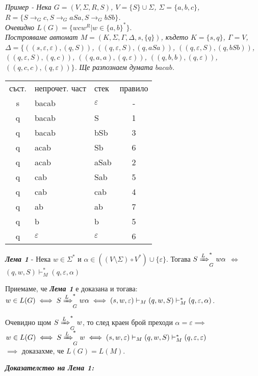 \documentclass[fleqn,12pt]{article}
\begin{document}
\begin{flushleft}
\textit{Пример - Нека $G = (V, \Sigma, R, S)$, $V = \{S\} \cup \Sigma$, $\Sigma = \{a, b, c\}$, $R = \{S \to_G c, S \to_G aSa, S \to_G bSb\}$.} \\
\textit{Очевидно $L(G) = \{wcw^R | w \in \{a, b\}^*\}$}. \\
\textit{Построяваме автомат $M = (K, \Sigma, \Gamma, \Delta, s, \{q\})$, където $K = \{s, q\}$, $\Gamma = V$, $\Delta = \{$$((s, \varepsilon, \varepsilon), (q, S))$, $((q, \varepsilon, S), (q, aSa))$, $((q, \varepsilon, S), (q, bSb))$, $((q, \varepsilon, S), (q, c))$, $((q, a, a), (q, \varepsilon))$, $((q, b, b), (q, \varepsilon))$, $((q, c, c), (q, \varepsilon))$$\}$.}
\textit{Ще разпознаем думата $bacab$.}

\begin{tabular}{ |c|l|l|c| } 
\hline
съст. & непрочет. част & стек & правило \\ 
s & bacab & $\varepsilon$ & - \\
q & bacab & S & 1 \\
q & bacab & bSb & 3 \\
q & acab & Sb & 6 \\
q & acab & aSab & 2 \\
q & cab & Sab & 5 \\
q & cab & cab & 4 \\
q & ab & ab & 7 \\
q & b & b & 5 \\
q & $\varepsilon$ & $\varepsilon$ & 6 \\
\hline
\end{tabular}

\textit{\textbf{Лема 1}} - Нека $w \in \Sigma^*$ и $\alpha \in ((V \setminus \Sigma) \circ V^*) \cup \{\varepsilon\}$.
Тогава $S \xRightarrow[]{L}_G^* w\alpha$ $\iff$ $(q, w, S) \vdash_M^* (q, \varepsilon, \alpha)$

Приемаме, че \textit{\textbf{Лема 1}} е доказана и тогава: \\
$w \in L(G) \iff S \xRightarrow[]{L}_G^* w\alpha \iff (s, w, \varepsilon) \vdash_M (q, w, S) \vdash_M^* (q, \varepsilon, \alpha)$.

Очевидно щом $S \xRightarrow[]{L}_G^* w$, то след краен брой преходи $\alpha = \varepsilon \implies$ \\
$w \in L(G) \iff S \xRightarrow[]{L}_G^* w \iff (s, w, \varepsilon) \vdash_M (q, w, S) \vdash_M^* (q, \varepsilon, \varepsilon)$ \\
$\implies$ доказахме, че $L(G) = L(M)$.

\textit{\textbf{Доказателство на Лема 1:}} \\


\end{flushleft}
\end{document}
